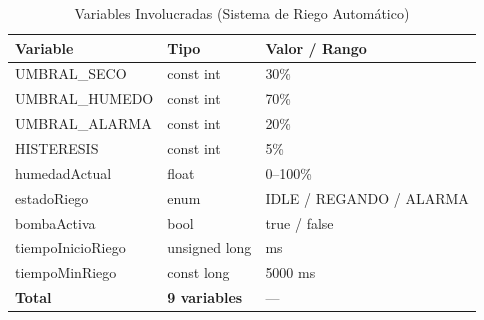 \begin{table}[ht]
\caption{Variables Involucradas (Sistema de Riego Automático)}
\label{tab:Table_1_R3}
\centering
\renewcommand{\arraystretch}{1.3}
\begin{tabularx}{\columnwidth}{X p{2.0cm} p{2.0cm}}
\toprule
\textbf{Variable} & \textbf{Tipo} & \textbf{Valor / Rango} \\
\midrule
UMBRAL\_SECO   & const int    & 30\%       \\
UMBRAL\_HUMEDO & const int    & 70\%       \\
UMBRAL\_ALARMA & const int    & 20\%       \\
HISTERESIS     & const int    & 5\%        \\
humedadActual  & float        & 0--100\%   \\
estadoRiego    & enum         & IDLE / REGANDO / ALARMA \\
bombaActiva    & bool         & true / false \\
tiempoInicioRiego & unsigned long & ms      \\
tiempoMinRiego & const long   & 5000 ms    \\
\midrule
\textbf{Total} & \textbf{9 variables} & --- \\
\bottomrule
\end{tabularx}
\end{table}